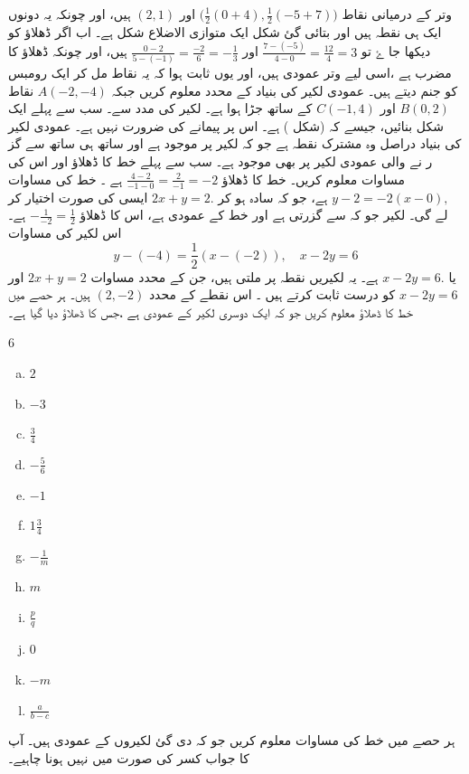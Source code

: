 وتر کے درمیانی نقاط \( \big( \frac{1}{2} (0+4), \frac{1}{2} (-5+7) \big) \) اور \( (2,1) \) ہیں، اور چونکہ یہ دونوں ایک ہی نقطہ ہیں اور بتائی گئ شکل ایک متوازی الاضلاع شکل ہے۔
اب اگر ڈھلاؤ کو دیکھا جا ۓ تو \( \frac{7-(-5)}{4-0} = \frac{12}{4} = 3 \)  اور \( \frac{0-2}{5-(-1)} = \frac{-2}{6}= - \frac{1}{3} \) ہیں، اور چونکہ ڈھلاؤ کا مضرب  ہے ،اسی لیے وتر عمودی ہیں، اور یوں ثابت ہوا کہ یہ نقاط مل کر ایک رومبس کو جنم دیتے ہیں۔ 
عمودی لکیر کی بنیاد کے محدد معلوم کریں جبکہ \( A(-2,-4)\) نقاط \(B(0,2) \)  اور \( C(-1,4) \) کے ساتھ  جڑا ہوا  ہے۔ لکیر کی مدد سے۔
سب سے پہلے ایک شکل بنائیں، جیسے کہ (شکل  ) ہے۔ اس پر پیمانے کی ضرورت نہیں ہے۔ عمودی لکیر کی بنیاد دراصل وہ مشترک نقطہ  ہے جو کہ لکیر پر موجود ہے اور ساتھ ہی ساتھ  سے  گز ر نے  والی عمودی لکیر  پر بھی موجود ہے۔ سب سے پہلے خط  کا ڈھلاؤ  اور اس کی مساوات معلوم کریں۔
 خط  کا ڈھلاؤ  \(\frac{4-2}{-1-0} = \frac{2}{-1} =-2 \) ہے ۔ خط  کی مساوات  \(y-2=-2(x-0), \) ہے، جو کہ سادہ ہو کر \( 2x+y=2. \) ایسی کی صورت اختیار کر لے گی۔
لکیر جو کہ  سے گزرتی ہے اور خط  کے عمودی ہے، اس کا ڈھلاؤ   \( - \frac{1}{-2} = \frac{1}{2} \) ہے۔ 
اس لکیر کی مساوات 
\[ y-(-4)= \frac{1}{2} (x-(-2)), \quad x-2y=6 \]
یا \( x-2y=6. \) ہے۔
یہ لکیریں نقطہ پر ملتی ہیں، جن کے محدد مساوات \(2x+y=2 \)  اور \( x-2y=6\) کو درست ثابت کرتے ہیں ۔ اس نقطے کے محدد \( (2,-2) \) ہیں۔
ہر حصے میں خط کا ڈھلاؤ معلوم کریں جو کہ ایک دوسری لکیر کے عمودی ہے ،جس کا ڈھلاؤ دیا گیا ہے۔
\begin{multicols}{6}
\begin{enumerate}[a.]
\item \(2\)
\item \(-3\)
\item \(\frac{3}{4} \)
\item \(-\frac{5}{6} \)
\item \(-1 \)
\item \(1\frac{3}{4} \)
\item \(-\frac{1}{m} \)
\item \(m \)
\item \(\frac{p}{q} \)
\item \(0 \)
\item \(-m \)
\item \(\frac{a}{b-c} \)
\end{enumerate}
\end{multicols}
ہر حصے میں خط کی مساوات معلوم کریں جو کہ دی گئ لکیروں کے عمودی ہیں۔ آپ کا جواب کسر کی صورت میں نہیں ہونا چاہیے۔
